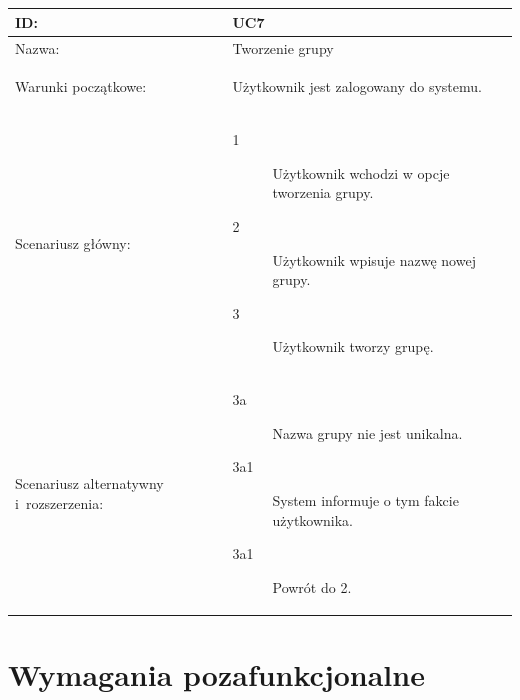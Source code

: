 \documentclass[11pt,a4paper,polish,thesis]{dcsbook}
\begin{document}
\\\\ \begin{tabular}{|p{2.5cm}|p{11.5cm}|}  \hline ID: &
UC7
\\ \hline Nazwa: &
Tworzenie grupy
\\ \hline Warunki początkowe: &
\begin{description}
\item Użytkownik jest zalogowany do systemu.
\end{description}
\\ \hline Scenariusz główny: &
\begin{description}
\item[1] Użytkownik wchodzi w opcje tworzenia grupy.
\item[2] Użytkownik wpisuje nazwę nowej grupy.
\item[3] Użytkownik tworzy grupę.
\end{description}
\\ \hline Scenariusz alternatywny i~rozszerzenia: &
\begin{description}
\item[3a] Nazwa grupy nie jest unikalna.
\item[3a1] System informuje o tym fakcie użytkownika.
\item[3a1] Powrót do 2.
\end{description}
\\ \hline \end{tabular}
\section{Wymagania pozafunkcjonalne}
\end{document}
